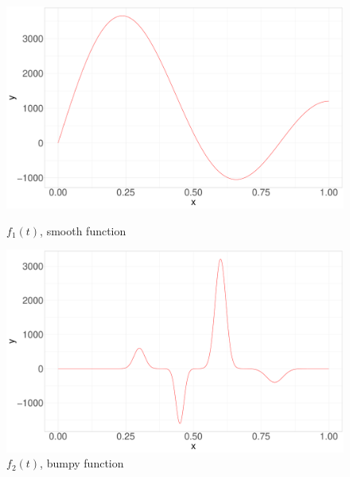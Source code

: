 \documentclass[11pt,twoside,a4paper]{article}
\begin{document}
		\begin{figure}[H]
			\centering
			\begin{minipage}{.5\textwidth}
				\centering
  				\includegraphics[width=\textwidth]{../Graphics/f1_plot.pdf}
  				\caption{$f_1(t)$, smooth function}
  				\label{fig:test1}
			\end{minipage}%
			\begin{minipage}{.5\textwidth}
	  			\centering
  				\includegraphics[width=\textwidth]{../Graphics/f2_plot.pdf}
  				\caption{$f_2(t)$, bumpy function}
  				\label{fig:test2}
			\end{minipage}
		\end{figure}
		
\end{document}
